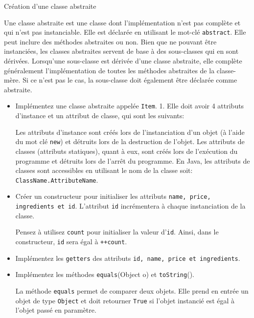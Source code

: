 \begin{Exercice}[15 minutes]{Création d'une classe abstraite}

	Une classe abstraite est une classe dont l'implémentation n'est pas complète et qui n'est pas instanciable. Elle est déclarée en utilisant le mot-clé \lstinline{abstract}. Elle peut inclure des méthodes abstraites ou non. Bien que ne pouvant être instanciées, les classes abstraites servent de base à des sous-classes qui en sont dérivées.
	Lorsqu'une sous-classe est dérivée d'une classe abstraite, elle complète généralement l'implémentation de toutes les méthodes abstraites de la classe-mère. Si ce n'est pas le cas, la sous-classe doit également être déclarée comme abstraite.
	
	 
	
	\begin{itemize}
		\item Implémentez une classe abstraite appelée \lstinline{Item}.
		1. Elle doit avoir 4 attributs d'instance et un attribut de classe, qui sont les suivants:
		 
		\begin{conseil}
			Les attributs d'instance sont créés lors de l'instanciation d'un objet (à l'aide du mot clé \lstinline{new}) et détruits lors de la destruction de l'objet. Les attributs de classes (attributs statiques), quant à eux, sont créés lors de l'exécution du programme et détruits lors de l'arrêt du programme. En Java, les attributs de classes sont accessibles en utilisant le nom de la classe soit: \lstinline{ClassName.AttributeName}.
		\end{conseil}
		\item Créer un constructeur pour initialiser les attributs \lstinline{name, price, ingredients et id}. L'attribut \lstinline{id} incrémentera à chaque instanciation de la classe.
		\begin{conseil}
			Pensez à utilisez \lstinline{count} pour initialiser la valeur d'\lstinline{id}. Ainsi, dans le constructeur, \lstinline{id} sera égal à \lstinline{++count}.
		\end{conseil}
		\item Implémentez les \lstinline{getters} des attributs \lstinline{id, name, price et ingredients}.
		\item Implémentez les méthodes \lstinline{equals}(Object o) et \lstinline{toString}().
	
	\begin{conseil}
	La méthode \lstinline{equals} permet de comparer deux objets. Elle prend en entrée un objet de type \lstinline{Object} et doit retourner \lstinline{True} si l'objet instancié est égal à l'objet passé en paramètre.
	\end{conseil}
\end{itemize}
		\begin{solution}  
			 
		\end{solution}
	\end{Exercice}
	
